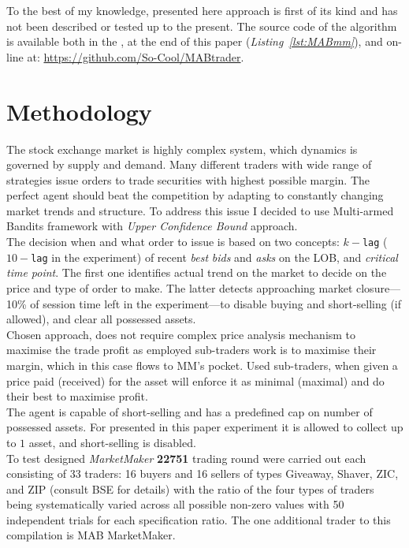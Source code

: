 \documentclass{llncs}
\begin{document}
To the best of my knowledge, presented here approach is first of its kind and has not been described or tested up to the present. The source code of the algorithm is available both in the \emph{\appendixname}, at the end of this paper (\emph{Listing~\ref{lst:MABmm}}), and on-line at: \url{https://github.com/So-Cool/MABtrader}.\\

\section{Methodology}
The stock exchange market is highly complex system, which dynamics is governed by supply and demand. Many different traders with wide range of strategies issue orders to trade securities with highest possible margin. The perfect agent should beat the competition by adapting to constantly changing market trends and structure. To address this issue I decided to use Multi-armed Bandits framework with \emph{Upper Confidence Bound} approach.\\

The decision when and what order to issue is based on two concepts: $k-$\texttt{lag} ($10-$\texttt{lag} in the experiment) of recent \emph{best} \emph{bids} and \emph{asks} on the LOB, and \emph{critical time point}. The first one identifies actual trend on the market to decide on the price and type of order to make. The latter detects approaching market closure---10\% of session time left in the experiment---to disable buying and short-selling (if allowed), and clear all possessed assets.\\
Chosen approach, does not require complex price analysis mechanism to maximise the trade profit as employed sub-traders work is to maximise their margin, which in this case flows to MM's pocket. Used sub-traders, when given a price paid (received) for the asset will enforce it as minimal (maximal) and do their best to maximise profit.\\
The agent is capable of short-selling and has a predefined cap on number of possessed assets. For presented in this paper experiment it is allowed to collect up to $1$ asset, and short-selling is disabled.\\

To test designed \emph{MarketMaker} \textbf{22751} trading round were carried out each consisting of 33 traders: 16 buyers and 16 sellers of types Giveaway, Shaver, ZIC, and ZIP (consult BSE for details) with the ratio of the four types of traders being systematically varied across all possible non-zero values with 50 independent trials for each specification ratio. The one additional trader to this compilation is MAB MarketMaker.
\end{document}

